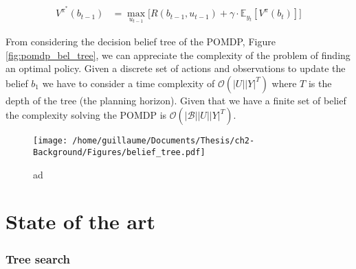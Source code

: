 \begin{align}\label{eq:optimal_value_f}
 V^{\pi^*}(b_{t-1}) &= \max_{u_{t-1}} \bigg[ R(b_{t-1},u_{t-1}) + \gamma \cdot \mathbb{E}_{y_t}\left[ V^{\pi}(b_t)  \right] \bigg]
\end{align}

From considering the decision belief tree of the POMDP, Figure \ref{fig:pomdp_bel_tree}, we can appreciate the complexity of the problem
of finding an optimal policy. Given a discrete set of actions and observations to update the belief $b_1$ we have to consider a time 
complexity of $\mathcal{O}(|U||Y|^T)$ where $T$ is the depth of the tree (the planning horizon). Given that we have a finite set of 
belief the complexity solving the POMDP is $\mathcal{O}(|\mathcal{B}||U||Y|^T)$. 


\begin{figure}[h]
 \centering
 \texttt{[image: /home/guillaume/Documents/Thesis/ch2-Background/Figures/belief\_tree.pdf]}
  \caption{ad}
\end{figure}


\section{State of the art}






%
%
%
%
%

\cite{Sol_POMDP_Policy_space_1998}

\subsubsection{Tree search}

